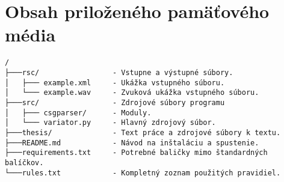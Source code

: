 \chapter{Obsah priloženého pamäťového média}
\begin{verbatim}
/
├───rsc/                 - Vstupne a výstupné súbory.
│   ├─── example.xml     - Ukážka vstupného súboru.
│   └─── example.wav     - Zvuková ukážka vstupného súboru.
├───src/                 - Zdrojové súbory programu
│   ├─── csgparser/      - Moduly.
│   └─── variator.py     - Hlavný zdrojový súbor.
├───thesis/              - Text práce a zdrojové súbory k textu.
├───README.md            - Návod na inštaláciu a spustenie.
├───requirements.txt     - Potrebné baličky mimo štandardných balíčkov.
└───rules.txt            - Kompletný zoznam použitých pravidiel.
\end{verbatim}




